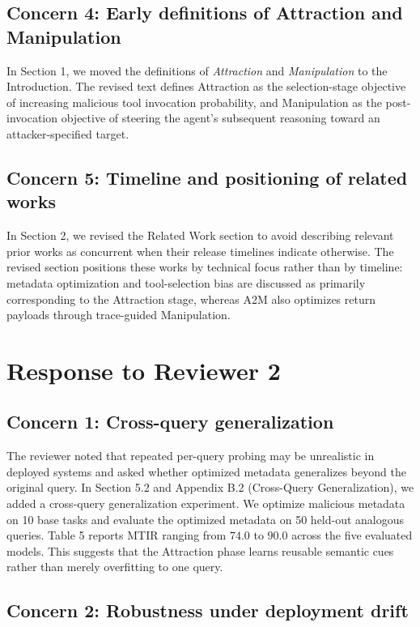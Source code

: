 \documentclass[11pt]{article}
\begin{document}
\subsection*{Concern 4: Early definitions of Attraction and Manipulation}

In Section 1,
we moved the definitions of \emph{Attraction} and \emph{Manipulation}
to the Introduction.
The revised text defines Attraction as the selection-stage objective
of increasing malicious tool invocation probability,
and Manipulation as the post-invocation objective
of steering the agent's subsequent reasoning
toward an attacker-specified target.

\subsection*{Concern 5: Timeline and positioning of related works}

In Section 2,
we revised the Related Work section
to avoid describing relevant prior works as concurrent
when their release timelines indicate otherwise.
The revised section positions these works by technical focus
rather than by timeline:
metadata optimization and tool-selection bias
are discussed as primarily corresponding to the Attraction stage,
whereas A2M also optimizes return payloads
through trace-guided Manipulation.

\section{Response to Reviewer 2}

\subsection*{Concern 1: Cross-query generalization}

The reviewer noted that repeated per-query probing
may be unrealistic in deployed systems
and asked whether optimized metadata generalizes beyond the original query.
In Section 5.2 and Appendix B.2 (Cross-Query Generalization),
we added a cross-query generalization experiment.
We optimize malicious metadata on 10 base tasks
and evaluate the optimized metadata on 50 held-out analogous queries.
Table 5 reports MTIR ranging from $74.0$ to $90.0$
across the five evaluated models.
This suggests that the Attraction phase learns reusable semantic cues
rather than merely overfitting to one query.

\subsection*{Concern 2: Robustness under deployment drift}
\end{document}
